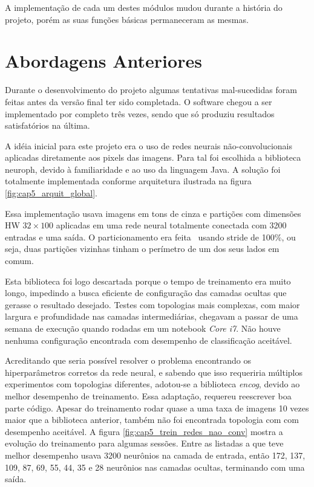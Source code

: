A implementação de cada um destes módulos mudou durante a história do projeto,
porém as suas funções básicas permaneceram as mesmas.

\section{Abordagens Anteriores}
Durante o desenvolvimento do projeto algumas tentativas mal-sucedidas foram
feitas antes da versão final ter sido completada. O software chegou a ser
implementado por completo três vezes, sendo que só produziu resultados
satisfatórios na última.

A idéia inicial para este projeto era o uso de redes neurais não-convolucionais
aplicadas diretamente aos pixels das imagens. Para tal foi escolhida a
biblioteca neuroph, devido à familiaridade e ao uso da linguagem Java. A
solução foi totalmente implementada conforme arquitetura ilustrada na figura
\ref{fig:cap5_arquit_global}.

Essa implementação usava imagens em tons de cinza e partições com dimensões HW
$32 \times 100$ aplicadas em uma rede neural totalmente conectada com 3200
entradas e uma saída. O particionamento era feita  usando stride de 100\%, ou
seja, duas partições vizinhas tinham o perímetro de um dos seus lados em comum.

Esta biblioteca foi logo descartada porque o tempo de treinamento era muito
longo, impedindo a busca eficiente de configuração das camadas ocultas que
gerasse o resultado desejado. Testes com topologias mais complexas, com maior
largura e profundidade nas camadas intermediárias, chegavam a passar de uma
semana de execução quando rodadas em um notebook \emph{Core i7}. Não houve
nenhuma configuração encontrada com desempenho de classificação aceitável.

Acreditando que seria possível resolver o problema encontrando os
hiperparâmetros corretos da rede neural, e sabendo que isso requeriria
múltiplos experimentos com topologias diferentes, adotou-se a biblioteca
\emph{encog},
devido ao melhor desempenho de treinamento. Essa adaptação, requereu reescrever
boa parte código. Apesar do treinamento rodar quase a uma taxa de imagens 10
vezes maior que a biblioteca anterior, também não foi encontrada topologia
com com desempenho aceitável. A figura
\ref{fig:cap5_trein_redes_nao_conv} mostra a
evolução do treinamento para algumas sessões. Entre as listadas a que teve
melhor desempenho usava 3200 neurônios na camada de entrada, então 172, 137,
109, 87, 69, 55, 44, 35 e 28 neurônios nas camadas ocultas, terminando
com uma saída.


